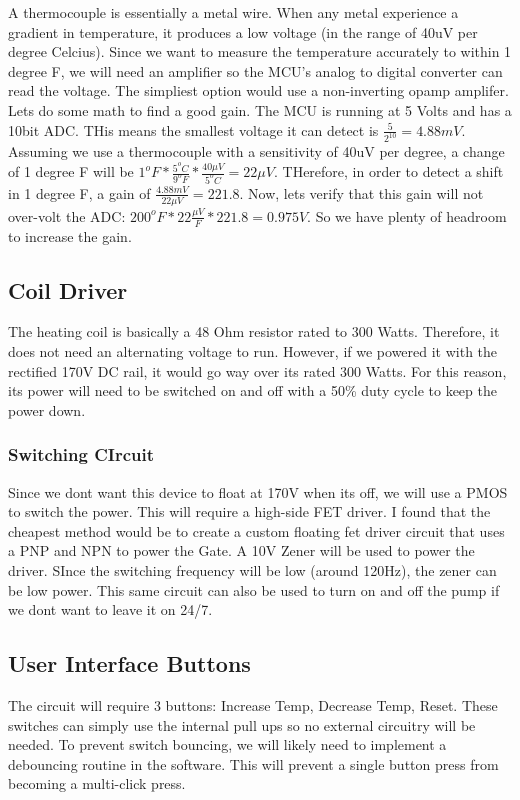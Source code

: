 \documentclass[12pt,letterpaper]{article}
\begin{document}
A thermocouple is essentially a metal wire.
When any metal experience a gradient in temperature, it produces a low voltage (in the range of 40uV per degree Celcius).
Since we want to measure the temperature accurately to within 1 degree F, we will need an amplifier so the MCU's analog to digital converter can read the voltage.
The simpliest option would use a non-inverting opamp amplifer.\\

Lets do some math to find a good gain.  
The MCU is running at 5 Volts and has a 10bit ADC.  
THis means the smallest voltage it can detect is $ \frac{5}{2^{10}} = 4.88 mV $.
Assuming we use a thermocouple with a sensitivity of 40uV per degree, a change of 1 degree F will be
$1^oF * \frac{5^oC}{9^oF} * \frac{40 \mu V}{5^oC} = 22 \mu V$.
THerefore, in order to detect a shift in 1 degree F, a gain of $\frac{4.88 mV}{22 \mu V} = 221.8$.
Now, lets verify that this gain will not over-volt the ADC: $200^oF * 22\frac{\mu V}{F} * 221.8 = 0.975 V$.
So we have plenty of headroom to increase the gain.



\subsection{Coil Driver}
The heating coil is basically a 48 Ohm resistor rated to 300 Watts.
Therefore, it does not need an alternating voltage to run.
However, if we powered it with the rectified 170V DC rail, it would go way over its rated 300 Watts.
For this reason, its power will need to be switched on and off with a 50\% duty cycle to keep the power down.\\
\subsubsection{Switching CIrcuit}
Since we dont want this device to float at 170V when its off, we will use a PMOS to switch the power.
This will require a high-side FET driver.
I found that the cheapest method would be to create a custom floating fet driver circuit that uses a PNP and NPN to power the Gate.  A 10V Zener will be used to power the driver.
SInce the switching frequency will be low (around 120Hz), the zener can be low power.
This same circuit can also be used to turn on and off the pump if we dont want to leave it on 24/7.

\subsection{User Interface Buttons}
The circuit will require 3 buttons:  Increase Temp, Decrease Temp, Reset.
These switches can simply use the internal pull ups so no external circuitry will be needed.
To prevent switch bouncing, we will likely need to implement a debouncing routine in the software.
This will prevent a single button press from becoming a multi-click press.
\end{document}
